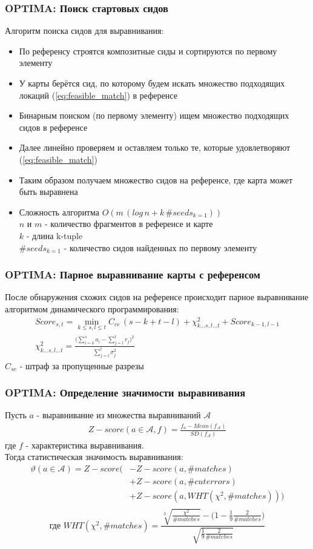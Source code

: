 \begin{frame}
\frametitle{OPTIMA: Поиск стартовых сидов}
Алгоритм поиска сидов для выравнивания:
\begin{itemize}
  \item По референсу строятся композитные сиды и сортируются по первому элементу
  \item У карты берётся сид, по которому будем искать множество подходящих локаций (\ref{eq:feasible_match}) в референсе
  \item Бинарным поиском (по первому элементу) ищем множество подходящих сидов в референсе
  \item Далее линейно проверяем и оставляем только те, которые удовлетворяют (\ref{eq:feasible_match})
  \item Таким образом получаем множество сидов на референсе, где карта может быть выравнена
  \item Сложность алгоритма $O(m \, (log \, n + k \, \#seeds_{k=1}))$\\
  $n$ и $m$ - количество фрагментов в референсе и карте \\
  $k$ - длина k-tuple \\
  $\#seeds_{k=1}$ - количество сидов найденных по первому элементу
\end{itemize}
\end{frame}

\begin{frame}
\frametitle{OPTIMA: Парное выравнивание карты с референсом}
После обнаружения схожих сидов на референсе происходит парное выравнивание алгоритмом динамического программирования:
\begin{gather*}
Score_{s,t} = \min\limits_{k \le s, l \le t} C_{ce} \, (s - k + t - l) + \chi_{k \dots s, l \dots t}^2 + Score_{k-1,l-1} \\
\chi_{k \dots s, l \dots t}^2 = \frac{\bigg(\sum\limits_{i = k}^s o_i - \sum\limits_{j = l}^t r_j \bigg)^2}{\sum\limits_{j = l}^t\sigma_j^2}
\end{gather*}
$C_{se}$ - штраф за пропущенные разрезы
\end{frame}

\begin{frame}
\frametitle{OPTIMA: Определение значимости выравнивания}
Пусть $a$ - выравнивание из множества выравниваний $\mathcal{A}$
\begin{gather*}
Z-score(a \in \mathcal{A}, f) = \frac{f_{a} - Mean(f_{\mathcal{A}})}{SD(f_{\mathcal{A}})}
\end{gather*}
где $f$ - характеристика выравнивания.\\
 Тогда статистическая значимость выравнивания:
\begin{align*}
  \vartheta (a \in \mathcal{A}) = Z-score( & -Z-score(a, \#matches) \\
  & + Z-score(a, \#cuterrors) \\
  & + Z-score(a, WHT(\chi^2, \#matches))) \\
\end{align*}
\[\text{где } WHT(\chi^2, \#matches) = \frac{\sqrt[3]{\frac{\chi^2}{\#matches}} - \big(1 - \frac{1}{9} \frac{2}{\#matches}\big)}{\sqrt{\frac{1}{9} \frac{2}{\#matches}}}\]
\end{frame}

